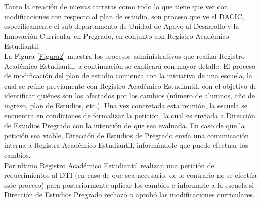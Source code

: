 		Tanto la creación de nuevas carreras como todo lo que tiene que ver con modificaciones con respecto al plan de estudio, son proceso que ve el DACIC, específicamente el sub-departamento de Unidad de Apoyo al Desarrollo y la Innovación Curricular en Pregrado, en conjunto con Registro Académico Estudiantil.
		\\
		
		La Figura \ref{Figura2} muestra los procesos administrativos que realiza Registro Académico Estudiantil, a continuación se explicará con mayor detalle.
		El proceso de modificación del plan de estudio comienza con la iniciativa de una escuela, la cual se reúne previamente con Registro Académico Estudiantil, con el objetivo  de identificar quiénes son los afectados por los cambios (número de alumnos, año de ingreso, plan de Estudios, etc.). Una vez concretada esta reunión, la escuela se encuentra en condiciones de formalizar la petición, la cual es enviada a Dirección de Estudios Pregrado con la intención de que sea evaluada. En caso de que la petición sea viable, Dirección de Estudios de Pregrado envía una comunicación interna a Registra Académico Estudiantil, informándole que puede efectuar los cambios.
		\\
		
		Por ultimo Registro Académico Estudiantil realizan una petición de requerimientos al DTI (en caso de que sea necesario, de lo contrario no se efectúa este proceso) para posteriormente aplicar los cambios e informarle a la escuela si Dirección de Estudios Pregrado rechazó o aprobó las modificaciones curriculares.
		
